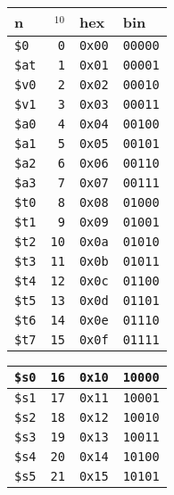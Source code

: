 \documentclass[12pt]{article}
\begin{document}
\begin{spacing}{0.9}
\begin{multicols*}{2}
\begin{flushleft}
\begin{outline}[longenum]
  \\
  \begin{tabular}{|l r l l|}\hline
  n & $_{10}$ & hex & bin   \\\hline
  \verb|$0 | & \verb| 0| & \verb|0x00| & \verb|00000| \\ \hline
  \verb|$at| & \verb| 1| & \verb|0x01| & \verb|00001| \\ \hline \hline
  \verb|$v0| & \verb| 2| & \verb|0x02| & \verb|00010| \\ \hline
  \verb|$v1| & \verb| 3| & \verb|0x03| & \verb|00011| \\ \hline \hline
  \verb|$a0| & \verb| 4| & \verb|0x04| & \verb|00100| \\ \hline
  \verb|$a1| & \verb| 5| & \verb|0x05| & \verb|00101| \\ \hline
  \verb|$a2| & \verb| 6| & \verb|0x06| & \verb|00110| \\ \hline
  \verb|$a3| & \verb| 7| & \verb|0x07| & \verb|00111| \\ \hline \hline
  \verb|$t0| & \verb| 8| & \verb|0x08| & \verb|01000| \\ \hline
  \verb|$t1| & \verb| 9| & \verb|0x09| & \verb|01001| \\ \hline
  \verb|$t2| & \verb|10| & \verb|0x0a| & \verb|01010| \\ \hline
  \verb|$t3| & \verb|11| & \verb|0x0b| & \verb|01011| \\ \hline
  \verb|$t4| & \verb|12| & \verb|0x0c| & \verb|01100| \\ \hline
  \verb|$t5| & \verb|13| & \verb|0x0d| & \verb|01101| \\ \hline
  \verb|$t6| & \verb|14| & \verb|0x0e| & \verb|01110| \\ \hline
  \verb|$t7| & \verb|15| & \verb|0x0f| & \verb|01111| \\ \hline
  \end{tabular}
  \begin{tabular}{|l r l l|}\hline
  \verb|$s0| & \verb|16| & \verb|0x10| & \verb|10000| \\ \hline
  \verb|$s1| & \verb|17| & \verb|0x11| & \verb|10001| \\ \hline
  \verb|$s2| & \verb|18| & \verb|0x12| & \verb|10010| \\ \hline
  \verb|$s3| & \verb|19| & \verb|0x13| & \verb|10011| \\ \hline
  \verb|$s4| & \verb|20| & \verb|0x14| & \verb|10100| \\ \hline
  \verb|$s5| & \verb|21| & \verb|0x15| & \verb|10101| \\ \hline

\end{tabular}
\end{outline}
\end{flushleft}
\end{multicols*}
\end{spacing}
\end{document}
